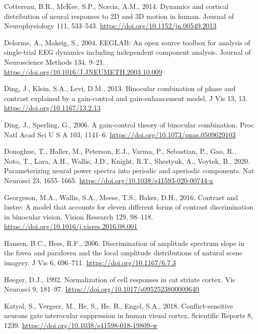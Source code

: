 \documentclass[
  12pt,
]{article}
\newlength{\cslhangindent}
\newenvironment{CSLReferences}[2] %
 {\begin{list}{}{%
  \setlength{\itemindent}{0pt}
  \setlength{\leftmargin}{0pt}
  \setlength{\parsep}{0pt}
  \ifodd #1
   \setlength{\leftmargin}{\cslhangindent}
   \setlength{\itemindent}{-1\cslhangindent}
  \fi
  \setlength{\itemsep}{#2\baselineskip}}}
 {\end{list}}
\begin{document}
\begin{CSLReferences}{1}{0}
Cottereau, B.R., McKee, S.P., Norcia, A.M., 2014. Dynamics and cortical
distribution of neural responses to 2D and 3D motion in human. Journal
of Neurophysiology 111, 533--543.
\url{https://doi.org/10.1152/jn.00549.2013}

Delorme, A., Makeig, S., 2004. EEGLAB: An open source toolbox for
analysis of single-trial EEG dynamics including independent component
analysis. Journal of Neuroscience Methods 134, 9--21.
\url{https://doi.org/10.1016/J.JNEUMETH.2003.10.009}

Ding, J., Klein, S.A., Levi, D.M., 2013. Binocular combination of phase
and contrast explained by a gain-control and gain-enhancement model. J
Vis 13, 13. \url{https://doi.org/10.1167/13.2.13}

Ding, J., Sperling, G., 2006. A gain-control theory of binocular
combination. Proc Natl Acad Sci U S A 103, 1141--6.
\url{https://doi.org/10.1073/pnas.0509629103}

Donoghue, T., Haller, M., Peterson, E.J., Varma, P., Sebastian, P., Gao,
R., Noto, T., Lara, A.H., Wallis, J.D., Knight, R.T., Shestyuk, A.,
Voytek, B., 2020. Parameterizing neural power spectra into periodic and
aperiodic components. Nat Neurosci 23, 1655--1665.
\url{https://doi.org/10.1038/s41593-020-00744-x}

Georgeson, M.A., Wallis, S.A., Meese, T.S., Baker, D.H., 2016. Contrast
and lustre: A model that accounts for eleven different forms of contrast
discrimination in binocular vision. Vision Research 129, 98--118.
\url{https://doi.org/10.1016/j.visres.2016.08.001}

Hansen, B.C., Hess, R.F., 2006. Discrimination of amplitude spectrum
slope in the fovea and parafovea and the local amplitude distributions
of natural scene imagery. J Vis 6, 696--711.
\url{https://doi.org/10.1167/6.7.3}

Heeger, D.J., 1992. Normalization of cell responses in cat striate
cortex. Vis Neurosci 9, 181--97.
\url{https://doi.org/10.1017/s0952523800009640}

Katyal, S., Vergeer, M., He, S., He, B., Engel, S.A., 2018.
Conflict-sensitive neurons gate interocular suppression in human visual
cortex. Scientific Reports 8, 1239.
\url{https://doi.org/10.1038/s41598-018-19809-w}


\end{CSLReferences}
\end{document}
